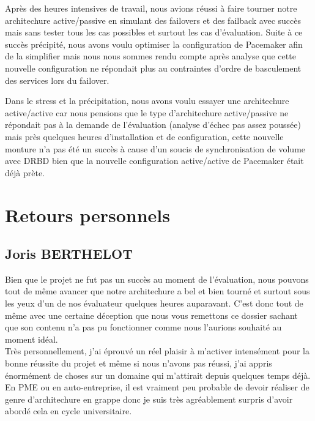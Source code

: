 \documentclass[11pt,a4paper]{report}
\begin{document}
            Après des heures intensives de travail, nous avions réussi à faire tourner notre architechure active/passive en simulant des failovers et des failback avec succès mais sans tester tous les cas possibles et surtout les cas d'évaluation. Suite à ce succès précipité, nous avons voulu optimiser la configuration de Pacemaker afin de la simplifier mais nous nous sommes rendu compte après analyse que cette nouvelle configuration ne répondait plus au contraintes d'ordre de basculement des services lors du failover.
            
            Dans le stress et la précipitation, nous avons voulu essayer une architechure active/active car nous pensions que le type d'architechure active/passive ne répondait pas à la demande de l'évaluation (analyse d'échec pas assez poussée) mais près quelques heures d'installation et de configuration, cette nouvelle monture n'a pas été un succès à cause d'un soucis de synchronisation de volume avec DRBD bien que la nouvelle configuration active/active de Pacemaker était déjà prète.
            
        \section{Retours personnels}
            
            \subsection{Joris \textsc{BERTHELOT}}
                
                Bien que le projet ne fut pas un succès au moment de l'évaluation, nous pouvons tout de même avancer que notre architechure a bel et bien tourné et surtout sous les yeux d'un de nos évaluateur quelques heures auparavant. C'est donc tout de même avec une certaine déception que nous vous remettons ce dossier sachant que son contenu n'a pas pu fonctionner comme nous l'aurions souhaité au moment idéal.\\
                
                Très personnellement, j'ai éprouvé un réel plaisir à m'activer intensément pour la bonne réussite du projet et même si nous n'avons pas réussi, j'ai appris énormément de choses sur un domaine qui m'attirait depuis quelques temps déjà. En PME ou en auto-entreprise, il est vraiment peu probable de devoir réaliser de genre d'architechure en grappe donc je suis très agréablement surpris d'avoir abordé cela en cycle universitaire.
                
\end{document}
